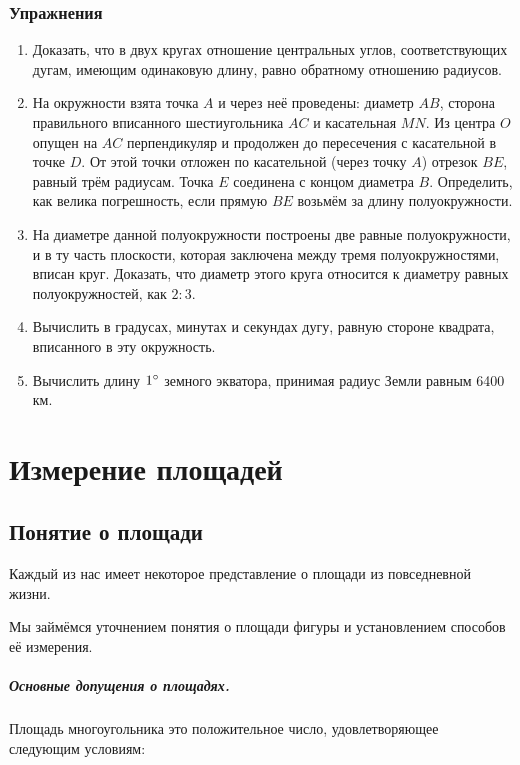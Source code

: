 \documentclass[oneside]{book}
\begin{document}
\subsection*{Упражнения}

\begin{enumerate}

 \item
Доказать, что в двух кругах отношение центральных углов, соответствующих дугам, имеющим одинаковую длину, равно обратному отношению радиусов.

 \item
На окружности взята точка $A$ и через неё проведены:
диаметр $AB$, сторона правильного вписанного шестиугольника $AC$ и касательная $MN$.
Из центра $O$ опущен на $AC$ перпендикуляр и продолжен до пересечения с касательной в точке $D$.
От этой точки отложен по касательной (через точку $A$) отрезок $BE$, равный трём радиусам.
Точка $E$ соединена с концом диаметра $B$.
Определить, как велика погрешность, если прямую $BE$ возьмём за длину полуокружности.

 \item
На диаметре данной полуокружности построены две равные полуокружности, и в ту часть плоскости, которая заключена между тремя полуокружностями, вписан круг.
Доказать, что диаметр этого круга относится к диаметру равных полуокружностей, как $2:3$.

 \item
Вычислить в градусах, минутах и секундах дугу, равную стороне квадрата, вписанного в эту окружность.

 \item
Вычислить длину $1\degree$ земного экватора, принимая радиус Земли равным 6400 км.

\end{enumerate}

\chapter{Измерение площадей}

\section{Понятие о площади}

Каждый из нас имеет некоторое представление о площади из повседневной жизни.

Мы займёмся уточнением понятия о площади фигуры и установлением способов её измерения.

\paragraph{Основные допущения о площадях.}\label{1938/243}
Площадь многоугольника это положительное число, удовлетворяющее следующим условиям:
\end{document}

